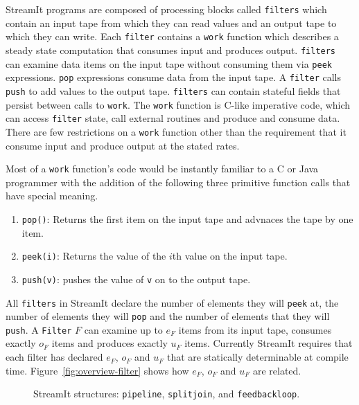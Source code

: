 StreamIt programs are composed of processing blocks called {\tt filters} which
contain an input tape from which they can read values and an output tape to which
they can write. Each {\tt filter} contains a {\tt work} function which describes 
a steady state computation that consumes input and produces output.
{\tt filters } can examine data items  on the input tape without consuming them 
via {\tt peek} expressions. {\tt pop} expressions consume data from the input
tape. A {\tt filter} calls {\tt push} to add values to the output tape.
{\tt filters} can contain stateful fields that persist between calls to {\tt work}. 
The {\tt work} function is C-like imperative code, 
which can access {\tt filter} state, call external routines and produce and consume data. 
There are few restrictions on a {\tt work} function other than the requirement that
it consume input and produce output at the stated rates.

Most of a {\tt work} function's code would be instantly familiar to 
a C or Java programmer with the addition of the following three primitive function 
calls that have special meaning.

\begin{enumerate}
\item {\tt pop()}:   Returns the first item on the input tape and advnaces the tape by one item.
\item {\tt peek(i)}: Returns the value of the $i$th value on the input tape.
\item {\tt push(v)}: pushes the value of {\tt v} on to the output tape.
\end{enumerate}

All {\tt filters} in StreamIt declare the number of elements they
will {\tt peek} at, the number of elements they will {\tt pop} and the number
of elements that they will {\tt push}. A {\tt Filter} $F$ can examine up to $e_F$ 
items from its input tape, consumes exactly $o_F$ items and produces exactly
$u_F$ items. Currently StreamIt requires that each filter has declared $e_F$, $o_F$ 
and $u_F$ that are statically determinable at compile time. 
Figure~\ref{fig:overview-filter} shows how $e_F$, $o_F$ and $u_F$ are related.




\begin{figure}
\center
\epsfxsize=3.0in
\caption{StreamIt structures: {\tt pipeline}, {\tt splitjoin}, and {\tt feedbackloop}.}
\label{fig:structures}
\end{figure}

